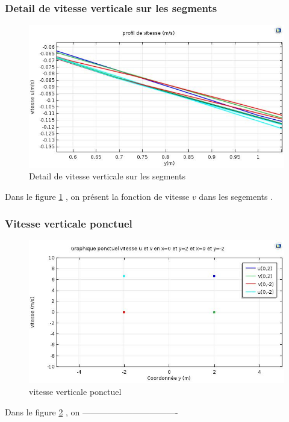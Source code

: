 \documentclass[a4paper,11pt]{report} %
\begin{document}
\subsubsection{Detail de vitesse verticale sur les segments }
\begin{figure}[!h]
\centering
\hspace*{0mm}\vfill
\begin{center} \includegraphics[width=1.\textwidth]{v_seg_detail.jpg} \end{center}
\vfill\hspace*{0mm}
\caption{Detail de vitesse verticale sur les segments}
\label{detail_vitesse_v_seg}
\end{figure}\pagebreak
Dans le figure \ref{detail_vitesse_v_seg} , on présent la fonction de vitesse $v$ dans les segements . 


\subsubsection{Vitesse verticale ponctuel }
\begin{figure}[!h]
\centering
\hspace*{0mm}\vfill
\begin{center} \includegraphics[width=1.\textwidth]{u_v_ponctuel.jpg} \end{center}
\vfill\hspace*{0mm}
\caption{vitesse verticale ponctuel }
\label{v_ponctuel}
\end{figure}\pagebreak
Dans le figure \ref{v_ponctuel} , on ----------------------------------
\end{document}
